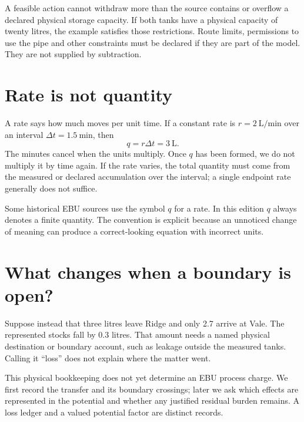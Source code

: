 A feasible action cannot withdraw more than the source contains or overflow a declared physical storage capacity. If both tanks have a physical capacity of twenty litres, the example satisfies those restrictions. Route limits, permissions to use the pipe and other constraints must be declared if they are part of the model. They are not supplied by subtraction.


\section{Rate is not quantity}
A rate says how much moves per unit time. If a constant rate is $r=2\ \mathrm{L/min}$ over an interval $\Delta t=1.5\ \mathrm{min}$, then
\begin{equation}\label{eq:rate}
 q=r\Delta t=3\ \mathrm{L}.
\end{equation}
The minutes cancel when the units multiply. Once $q$ has been formed, we do not multiply it by time again. If the rate varies, the total quantity must come from the measured or declared accumulation over the interval; a single endpoint rate generally does not suffice.

Some historical EBU sources use the symbol $q$ for a rate. In this edition $q$ always denotes a finite quantity. The convention is explicit because an unnoticed change of meaning can produce a correct-looking equation with incorrect units.

\section{What changes when a boundary is open?}
Suppose instead that three litres leave Ridge and only 2.7 arrive at Vale. The represented stocks fall by 0.3 litres. That amount needs a named physical destination or boundary account, such as leakage outside the measured tanks. Calling it ``loss'' does not explain where the matter went.

This physical bookkeeping does not yet determine an EBU process charge. We first record the transfer and its boundary crossings; later we ask which effects are represented in the potential and whether any justified residual burden remains. A loss ledger and a valued potential factor are distinct records.

